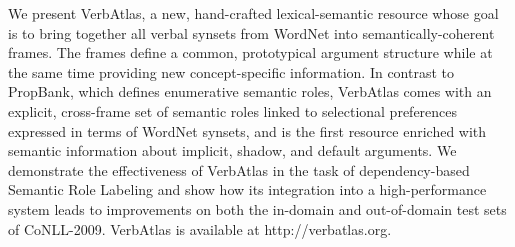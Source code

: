 We present VerbAtlas, a new, hand-crafted lexical-semantic resource whose goal is to bring together all verbal synsets from WordNet into semantically-coherent frames. The frames define a common, prototypical argument structure while at the same time providing new concept-specific information. In contrast to PropBank, which defines enumerative semantic roles, VerbAtlas comes with an explicit, cross-frame set of semantic roles linked to selectional preferences expressed in terms of WordNet synsets, and is the first resource enriched with semantic information about implicit, shadow, and default arguments.
We demonstrate the effectiveness of VerbAtlas in the task of dependency-based Semantic Role Labeling and show how its integration into a high-performance system leads to improvements on both the in-domain and out-of-domain test sets of CoNLL-2009. VerbAtlas is available at http://verbatlas.org.